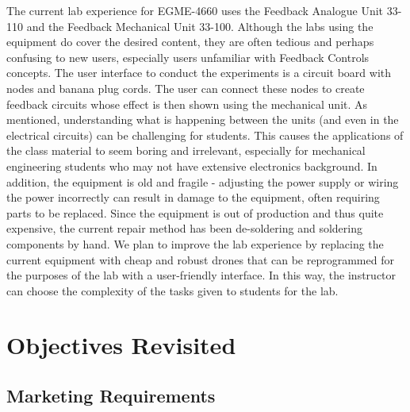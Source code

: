 \documentclass[12pt, titlepage]{article}
\begin{document}
The current lab experience for EGME-4660 uses the Feedback Analogue Unit 33-110 and the Feedback Mechanical Unit 33-100. Although the labs using the equipment do cover the desired content, they are often tedious and perhaps confusing to new users, especially users unfamiliar with Feedback Controls concepts. The user interface to conduct the experiments is a circuit board with nodes and banana plug cords. The user can connect these nodes to create feedback circuits whose effect is then shown using the mechanical unit. As mentioned, understanding what is happening between the units (and even in the electrical circuits) can be challenging for students. This causes the applications of the class material to  seem boring and irrelevant, especially for mechanical engineering students who may not have extensive electronics background. In addition, the equipment is old and fragile - adjusting the power supply or wiring the power incorrectly can result in damage to the equipment, often requiring parts to be replaced. Since the equipment is out of production and thus quite expensive, the current repair method has been de-soldering and soldering components by hand. We plan to improve the lab experience by replacing the current equipment with cheap and robust drones that can be reprogrammed for the purposes of the lab with a user-friendly interface. In this way, the instructor can choose the complexity of the tasks given to students for the lab.

\section{Objectives Revisited}
\subsection{Marketing Requirements}
\end{document}
